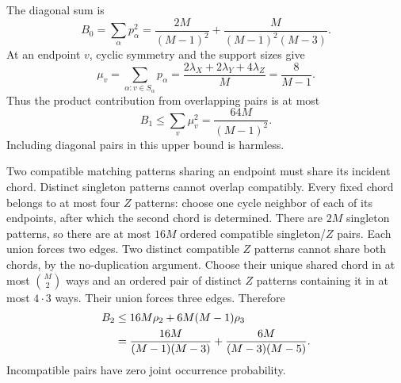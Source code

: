 \documentclass[11pt,letterpaper]{article}
\numberwithin{equation}{section}
\theoremstyle{definition}\newtheorem{definition}[theorem]{Definition}
\theoremstyle{remark}\newtheorem{remark}[theorem]{Remark}
\begin{document}
The diagonal sum is
\begin{equation}\label{cgr:ld:eq:B0}
 B_0=\sum_\alpha p_\alpha^2
 =\frac{2M}{(M-1)^2}+\frac M{(M-1)^2(M-3)}.
\end{equation}
At an endpoint $v$, cyclic symmetry and the support sizes give
\[
 \mu_v=\sum_{\alpha:v\in S_\alpha}p_\alpha
 =\frac{2\lambda_X+2\lambda_Y+4\lambda_Z}{M}
 =\frac8{M-1}.
\]
Thus the product contribution from overlapping pairs is at most
\begin{equation}\label{cgr:ld:eq:B1}
 B_1\le\sum_v\mu_v^2=\frac{64M}{(M-1)^2}.
\end{equation}
Including diagonal pairs in this upper bound is harmless.

Two compatible matching patterns sharing an endpoint must share
its incident chord. Distinct singleton patterns cannot overlap
compatibly. Every fixed chord belongs to at most four $Z$
patterns: choose one cycle neighbor of each of its endpoints,
after which the second chord is determined. There are $2M$
singleton patterns, so there are at most $16M$ ordered
compatible singleton/$Z$ pairs. Each union forces two edges.
Two distinct compatible $Z$ patterns cannot share both chords,
by the no-duplication argument. Choose their unique shared chord
in at most $\binom M2$ ways and an ordered pair of distinct
$Z$ patterns containing it in at most $4\cdot3$ ways. Their
union forces three edges. Therefore
\begin{align}
 B_2&\le16M\rho_2+6M(M-1)\rho_3\notag\\
 &=\frac{16M}{(M-1)(M-3)}
       +\frac{6M}{(M-3)(M-5)}.\label{cgr:ld:eq:B2}
\end{align}
Incompatible pairs have zero joint occurrence probability.
\end{document}
